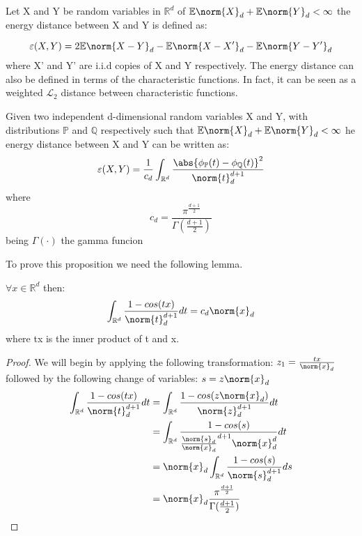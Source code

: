 \begin{defn}
Let X and Y be random variables in $\mathbb{R}^{d}$ of $\mathbb{E}\norm{X}_{d} + \mathbb{E}\norm{Y}_{d} < \infty$ the energy distance between X and Y is defined as:

\begin{equation}{}
\varepsilon (X,Y) = 2\mathbb{E}\norm{X-Y}_{d} - \mathbb{E}\norm{X-X'}_{d} - \mathbb{E}\norm{Y-Y'}_{d} 
\end{equation}\label{energy_distance}
where X' and Y' are i.i.d copies of X and Y respectively.
The energy distance can also be defined in terms of the characteristic functions. In fact, it can be seen as a weighted $\mathcal{L}_{2}$ distance between characteristic functions.
\end{defn}
\begin{prop}
Given two independent d-dimensional random variables X and Y, with distributions $\mathbb{P}$ and $\mathbb{Q}$ respectively such that $\mathbb{E}\norm{X}_{d} + \mathbb{E}\norm{Y}_{d} < \infty$ he energy distance between X and Y can be written as:
\vspace{5mm}
$$\varepsilon(X,Y) = \frac{1}{c_{d}}\int_{\mathbb{R}^{d}}\frac{\abs{\phi_{\mathbb{P}}(t)-\phi_{\mathbb{Q}}(t)}^{2}}{\norm{t}^{d+1}_{d}}$$
where
$$c_{d} = \frac{\pi^{\frac{d+1}{2}}}{\Gamma(\frac{d+1}{2})}$$
being $\Gamma(\cdot)$ the gamma funcion
\end{prop} \label{DcovPropRara}
To prove this proposition we need the following lemma.
\begin{lem}
$\forall x \in \mathbb{R}^{d}$ then:
\vspace{5mm}
$$\int_{\mathbb{R}^{d}}\frac{1-cos(tx)}{\norm{t}^{d+1}_{d}} dt = c_{d}\norm{x}_{d}$$
where tx is the inner product of t and x. \label{cd}
\end{lem}
\begin{proof}
We will begin by applying the following transformation: $z_{1} = \frac{tx}{\norm{x}_{d}}$
followed by the following change of variables:
$s = z\norm{x}_{d}$
\begin{equation}{}
\begin{split}
\int_{\mathbb{R}^{d}}\frac{1-cos(tx)}{\norm{t}^{d+1}_{d}} dt 
&= \int_{\mathbb{R}^{d}}\frac{1-cos(z\norm{x}_{d})}{\norm{z}^{d+1}_{d}} dt \\
&= \int_{\mathbb{R}^{d}}\frac{1-cos(s)}{\frac{\norm{s}_{d}}{\norm{x}_{d}}^{d+1} \norm{x}^{d}_{d}} dt \\
&=\norm{x}_{d}\int_{\mathbb{R}^{d}}\frac{1-cos(s)}{\norm{s}^{d+1}_{d}}ds \\
&=\norm{x}_{d}\frac{\pi^{\frac{d+1}{2}}}{\Gamma(\frac{d+1}{2})}
\end{split}
\end{equation}
\end{proof}
